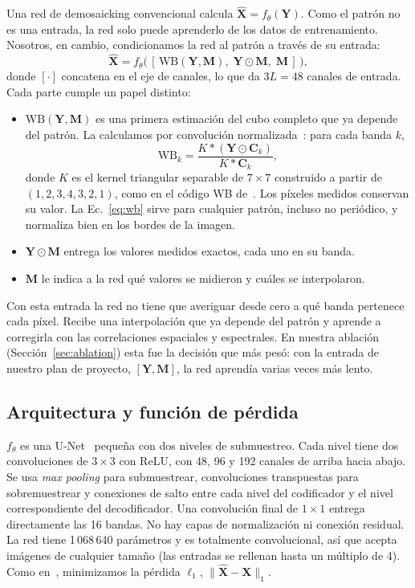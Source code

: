 \documentclass{article}
\def\X{{\mathbf X}}
\def\Y{{\mathbf Y}}
\def\C{{\mathbf C}}
\def\M{{\mathbf M}}
\newcommand{\wb}{\mathrm{WB}}
\begin{document}
Una red de demosaicking convencional calcula $\hat\X=f_\theta(\Y)$. Como el
patrón no es una entrada, la red solo puede aprenderlo de los datos de
entrenamiento. Nosotros, en cambio, condicionamos la red al patrón a través
de su entrada:
\begin{equation}
  \hat\X = f_\theta\big(\,[\,\wb(\Y,\M),\;\Y\odot\M,\;\M\,]\,\big),
  \label{eq:input}
\end{equation}
donde $[\cdot]$ concatena en el eje de canales, lo que da $3L=48$ canales de
entrada. Cada parte cumple un papel distinto:
\begin{itemize}
  \item $\wb(\Y,\M)$ es una primera estimación del cubo completo que ya
        depende del patrón. La calculamos por convolución
        normalizada~\cite{knutsson1993}: para cada banda $k$,
        \begin{equation}
          \wb_k = \frac{K * (\Y\odot\C_k)}{K * \C_k},
          \label{eq:wb}
        \end{equation}
        donde $K$ es el kernel triangular separable de $7\times7$ construido
        a partir de $(1,2,3,4,3,2,1)$, como en el código WB
        de~\cite{diaz2023}. Los píxeles medidos conservan su valor. La
        Ec.~\eqref{eq:wb} sirve para cualquier patrón, incluso no periódico,
        y normaliza bien en los bordes de la imagen.
  \item $\Y\odot\M$ entrega los valores medidos exactos, cada uno en su
        banda.
  \item $\M$ le indica a la red qué valores se midieron y cuáles se
        interpolaron.
\end{itemize}
Con esta entrada la red no tiene que averiguar desde cero a qué banda
pertenece cada píxel. Recibe una interpolación que ya depende del patrón y
aprende a corregirla con las correlaciones espaciales y espectrales. En
nuestra ablación (Sección~\ref{sec:ablation}) esta fue la decisión que más
pesó: con la entrada de nuestro plan de proyecto, $[\Y,\M]$, la red aprendía
varias veces más lento.

\subsection{Arquitectura y función de pérdida}

$f_\theta$ es una U-Net~\cite{ronneberger2015} pequeña con dos niveles de
submuestreo. Cada nivel tiene dos convoluciones de $3\times3$ con ReLU, con
48, 96 y 192 canales de arriba hacia abajo. Se usa \emph{max pooling} para
submuestrear, convoluciones transpuestas para sobremuestrear y conexiones de
salto entre cada nivel del codificador y el nivel correspondiente del
decodificador. Una convolución final de $1\times1$ entrega directamente las
16 bandas. No hay capas de normalización ni conexión residual. La red tiene
1\,068\,640 parámetros y es totalmente convolucional, así que acepta
imágenes de cualquier tamaño (las entradas se rellenan hasta un múltiplo
de 4). Como en~\cite{diaz2023}, minimizamos la pérdida $\ell_1$,
$\|\hat\X-\X\|_1$.
\end{document}
